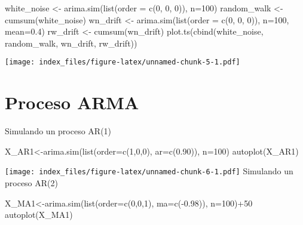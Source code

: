 \documentclass[
]{book}
\newenvironment{Shaded}{\begin{snugshade}}{\end{snugshade}}
\newcommand{\AttributeTok}[1]{\textcolor[rgb]{0.77,0.63,0.00}{#1}}
\newcommand{\DecValTok}[1]{\textcolor[rgb]{0.00,0.00,0.81}{#1}}
\newcommand{\FloatTok}[1]{\textcolor[rgb]{0.00,0.00,0.81}{#1}}
\newcommand{\FunctionTok}[1]{\textcolor[rgb]{0.00,0.00,0.00}{#1}}
\newcommand{\NormalTok}[1]{#1}
\newcommand{\OtherTok}[1]{\textcolor[rgb]{0.56,0.35,0.01}{#1}}
\newcommand{\SpecialCharTok}[1]{\textcolor[rgb]{0.00,0.00,0.00}{#1}}
\begin{document}
\begin{Shaded}
\begin{Highlighting}[]
\NormalTok{white\_noise }\OtherTok{\textless{}{-}} \FunctionTok{arima.sim}\NormalTok{(}\FunctionTok{list}\NormalTok{(}\AttributeTok{order =} \FunctionTok{c}\NormalTok{(}\DecValTok{0}\NormalTok{, }\DecValTok{0}\NormalTok{, }\DecValTok{0}\NormalTok{)), }\AttributeTok{n=}\DecValTok{100}\NormalTok{)}
\NormalTok{random\_walk }\OtherTok{\textless{}{-}} \FunctionTok{cumsum}\NormalTok{(white\_noise)}
\NormalTok{wn\_drift }\OtherTok{\textless{}{-}} \FunctionTok{arima.sim}\NormalTok{(}\FunctionTok{list}\NormalTok{(}\AttributeTok{order =} \FunctionTok{c}\NormalTok{(}\DecValTok{0}\NormalTok{, }\DecValTok{0}\NormalTok{, }\DecValTok{0}\NormalTok{)), }\AttributeTok{n=}\DecValTok{100}\NormalTok{, }\AttributeTok{mean=}\FloatTok{0.4}\NormalTok{)}
\NormalTok{rw\_drift }\OtherTok{\textless{}{-}} \FunctionTok{cumsum}\NormalTok{(wn\_drift)}
\FunctionTok{plot.ts}\NormalTok{(}\FunctionTok{cbind}\NormalTok{(white\_noise, random\_walk, wn\_drift, rw\_drift))}
\end{Highlighting}
\end{Shaded}

\texttt{[image: index\_files/figure-latex/unnamed-chunk-5-1.pdf]}

\hypertarget{proceso-arma}{%
\section{Proceso ARMA}\label{proceso-arma}}

Simulando un proceso AR(1)

\begin{Shaded}
\begin{Highlighting}[]
\NormalTok{X\_AR1}\OtherTok{\textless{}{-}}\FunctionTok{arima.sim}\NormalTok{(}\FunctionTok{list}\NormalTok{(}\AttributeTok{order=}\FunctionTok{c}\NormalTok{(}\DecValTok{1}\NormalTok{,}\DecValTok{0}\NormalTok{,}\DecValTok{0}\NormalTok{), }\AttributeTok{ar=}\FunctionTok{c}\NormalTok{(}\FloatTok{0.90}\NormalTok{)), }\AttributeTok{n=}\DecValTok{100}\NormalTok{)}
\FunctionTok{autoplot}\NormalTok{(X\_AR1)}
\end{Highlighting}
\end{Shaded}

\texttt{[image: index\_files/figure-latex/unnamed-chunk-6-1.pdf]}
Simulando un proceso AR(2)

\begin{Shaded}
\begin{Highlighting}[]
\NormalTok{X\_MA1}\OtherTok{\textless{}{-}}\FunctionTok{arima.sim}\NormalTok{(}\FunctionTok{list}\NormalTok{(}\AttributeTok{order=}\FunctionTok{c}\NormalTok{(}\DecValTok{0}\NormalTok{,}\DecValTok{0}\NormalTok{,}\DecValTok{1}\NormalTok{), }\AttributeTok{ma=}\FunctionTok{c}\NormalTok{(}\SpecialCharTok{{-}}\FloatTok{0.98}\NormalTok{)), }\AttributeTok{n=}\DecValTok{100}\NormalTok{)}\SpecialCharTok{+}\DecValTok{50}
\FunctionTok{autoplot}\NormalTok{(X\_MA1)}
\end{Highlighting}
\end{Shaded}
\end{document}
